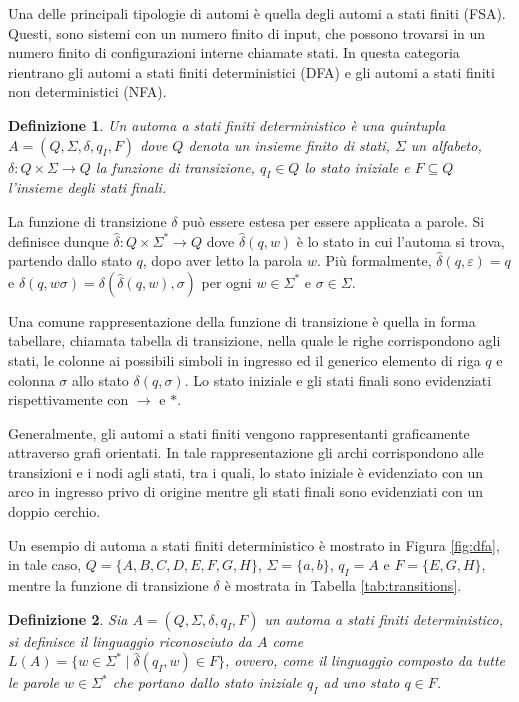 \documentclass[a4paper,12pt,twoside, openright]{report} %
\newtheorem{definition}{Definizione}[chapter] %
\begin{document}
Una delle principali tipologie di automi è quella degli automi a stati finiti (FSA). Questi, sono sistemi
con un numero finito di input, che possono trovarsi in un numero finito di configurazioni interne chiamate stati. 
In questa categoria rientrano gli automi a stati finiti deterministici (DFA) e gli automi a stati finiti 
non deterministici (NFA).

\begin{definition}
  \label{def:dfa}
  Un \emph{automa a stati finiti deterministico} è una quintupla $A = (Q, \Sigma, \delta, \allowbreak q_I, F)$
  dove $Q$ denota un insieme finito di stati, $\Sigma$ un alfabeto, $\delta: Q \times \Sigma \rightarrow Q$ 
  la funzione di transizione, $q_I \in Q$ lo stato iniziale e $F \subseteq Q$ l'insieme degli stati finali.
\end{definition}

La funzione di transizione $\delta$ può essere estesa per essere applicata a parole. Si definisce dunque
$\hat{\delta}: Q \times \Sigma^* \rightarrow Q$ dove $\hat{\delta}(q, w)$ è lo stato in cui l'automa si trova,
partendo dallo stato $q$, dopo aver letto la parola $w$. Più formalmente, $\hat{\delta}(q, \varepsilon) = q$ e
$\hat{\delta}(q, w\sigma) = \delta(\hat{\delta}(q, w), \sigma)$ per ogni $w \in \Sigma^*$ e $\sigma \in \Sigma$.

Una comune rappresentazione della funzione di transizione è quella in forma tabellare, chiamata tabella di transizione,
nella quale le righe corrispondono agli stati, le colonne ai possibili simboli in ingresso ed il generico elemento
di riga $q$ e colonna $\sigma$ allo stato $\delta(q, \sigma)$. Lo stato iniziale e gli stati finali sono evidenziati
rispettivamente con $\rightarrow$ e $*$.

Generalmente, gli automi a stati finiti vengono rappresentanti graficamente attraverso grafi orientati.
In tale rappresentazione gli archi corrispondono alle transizioni e i nodi agli stati, tra i quali, lo stato iniziale è
evidenziato con un arco in ingresso privo di origine mentre gli stati finali sono evidenziati con un doppio cerchio.

Un esempio di automa a stati finiti deterministico è mostrato in Figura \ref{fig:dfa}, in tale caso,
$Q = \{A, B, C, D, E, F, G, H\}$, $\Sigma = \{a, b\}$, $q_I = A$ e $F = \{E, G, H\}$, mentre
la funzione di transizione $\delta$ è mostrata in Tabella \ref{tab:transitions}.

\begin{definition}
  \label{def:reg-lang}
  Sia $A = (Q, \Sigma, \delta, q_I, F)$ un automa a stati finiti deterministico, si definisce il \emph{linguaggio
  riconosciuto} da $A$ come $L(A) = \{w \in \Sigma^* \mid \hat{\delta}(q_I, w) \in F\}$, ovvero, come
  il linguaggio composto da tutte le parole $w \in \Sigma^*$ che portano dallo stato iniziale $q_I$ ad
  uno stato $q \in F$.
\end{definition}
\end{document}

